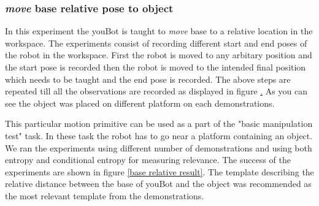 \FloatBarrier
\subsubsection{\textit{move} base relative pose to object }
In this experiment the youBot is taught to \textit{move} base to a relative
location in the workspace. The experiments consist of recording different start
and end poses of the robot in the workspace. First the robot is moved to any
arbitary position and the start pose is recorded then the robot is moved to the
intended final position which needs to be taught and the end pose is recorded.
The above steps are repeated till all the observations are recorded as
displayed in figure \href{base relative exp}.
As you can see the object was placed on different platform on each demonstrations.

This particular motion primitive
can be used as a part of the "basic manipulation test" task. In these task the
robot has to go near a platform containing an object. We ran the experiments
using different number of demonstrations and using both entropy and conditional
entropy for measuring relevance. The success of the experiments are shown in
figure \ref{base relative result}. The template describing the relative
distance between the base of youBot and the object was recommended as the most
relevant template from the demonstrations.

